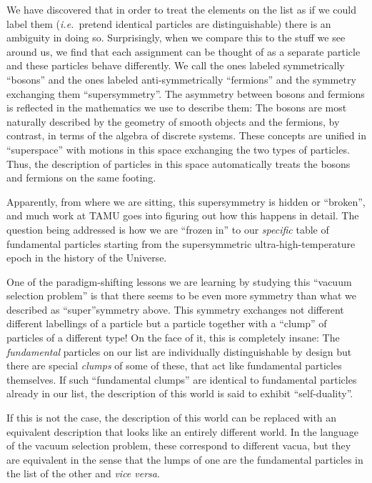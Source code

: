 \documentclass[12pt, fleqn]{article}
\begin{document}
We have discovered that in order to treat the elements on the list as if we could label them ({\it i.e.}\ pretend identical particles are distinguishable) there is an ambiguity in doing so. 
Surprisingly, when we compare this to the stuff we see around us, we find that each assignment can be thought of as a separate particle and these particles behave differently. 
We call the ones labeled symmetrically ``bosons'' and the ones labeled anti-symmetrically ``fermions'' and the symmetry exchanging them ``supersymmetry''.
The asymmetry between bosons and fermions is reflected in the mathematics we use to describe them: The bosons are most naturally described by the geometry of smooth objects and the fermions, by contrast, in terms of the algebra of discrete systems. 
These concepts are unified in ``superspace'' with motions in this space exchanging the two types of particles. 
Thus, the description of particles in this space automatically treats the bosons and fermions on the same footing. 

Apparently, from where we are sitting, this supersymmetry is hidden or ``broken'', and much work at TAMU goes into figuring out how this happens in detail. 
The question being addressed is how we are ``frozen in'' to our {\em specific} table of fundamental particles starting from the supersymmetric ultra-high-temperature epoch in the history of the Universe.

One of the paradigm-shifting lessons we are learning by studying this ``vacuum selection problem'' is that there seems to be even more symmetry than what we described as ``super''symmetry above. 
This symmetry exchanges not different different labellings of a particle but a particle together with a ``clump'' of particles of a different type! 
On the face of it, this is completely insane: The {\em fundamental} particles on our list are individually distinguishable by design but there are special {\em clumps} of some of these, that act like fundamental particles themselves. 
If such ``fundamental clumps'' are identical to fundamental particles already in our list, the description of this world is said to exhibit ``self-duality''. 

If this is not the case, the description of this world can be replaced with an equivalent description that looks like an entirely different world. In the language of the vacuum selection problem, these correspond to different vacua, but they are equivalent in the sense that the lumps of one are the fundamental particles in the list of the other and {\it vice versa}.
\end{document}
